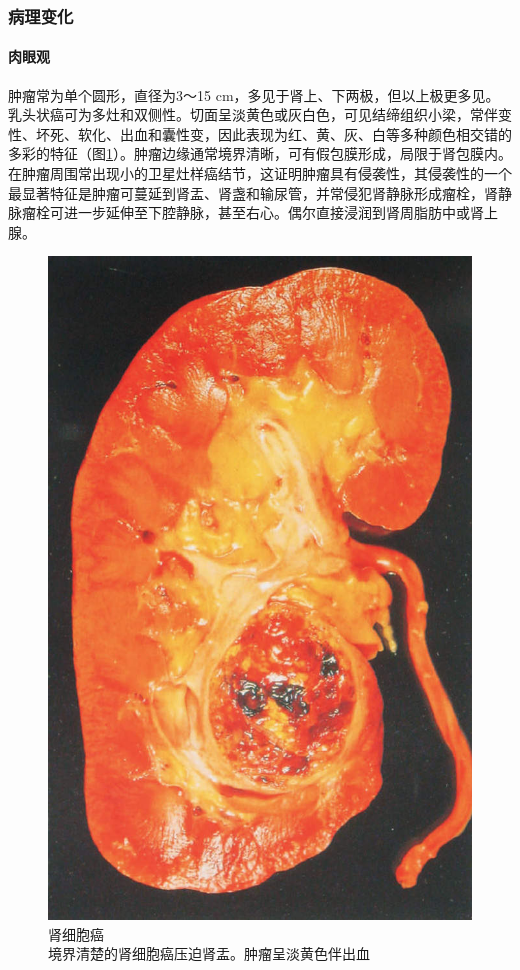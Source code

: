 \subsubsection{病理变化}

\paragraph{肉眼观}
肿瘤常为单个圆形，直径为3～15
cm，多见于肾上、下两极，但以上极更多见。乳头状癌可为多灶和双侧性。切面呈淡黄色或灰白色，可见结缔组织小梁，常伴变性、坏死、软化、出血和囊性变，因此表现为红、黄、灰、白等多种颜色相交错的多彩的特征（图\ref{fig10-29}）。肿瘤边缘通常境界清晰，可有假包膜形成，局限于肾包膜内。在肿瘤周围常出现小的卫星灶样癌结节，这证明肿瘤具有侵袭性，其侵袭性的一个最显著特征是肿瘤可蔓延到肾盂、肾盏和输尿管，并常侵犯肾静脉形成瘤栓，肾静脉瘤栓可进一步延伸至下腔静脉，甚至右心。偶尔直接浸润到肾周脂肪中或肾上腺。

\begin{figure}[!htbp]
 \centering
 \includegraphics{./images/Image00178.jpg}
 \captionsetup{justification=centering}
 \caption{肾细胞癌\\ {\small 境界清楚的肾细胞癌压迫肾盂。肿瘤呈淡黄色伴出血}}
\label{fig10-29}
  \end{figure}

